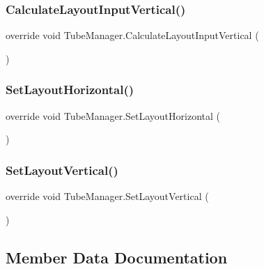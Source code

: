 \subsubsection{\texorpdfstring{Calculate\+Layout\+Input\+Vertical()}{CalculateLayoutInputVertical()}}
{\footnotesize\ttfamily override void Tube\+Manager.\+Calculate\+Layout\+Input\+Vertical (\begin{DoxyParamCaption}{ }\end{DoxyParamCaption})\hspace{0.3cm}{\ttfamily [inline]}}

\mbox{\label{class_tube_manager_a3a369e137062906ec47a4e1db6cad5e4}} 
\subsubsection{\texorpdfstring{Set\+Layout\+Horizontal()}{SetLayoutHorizontal()}}
{\footnotesize\ttfamily override void Tube\+Manager.\+Set\+Layout\+Horizontal (\begin{DoxyParamCaption}{ }\end{DoxyParamCaption})\hspace{0.3cm}{\ttfamily [inline]}}

\mbox{\label{class_tube_manager_afd4503acb46cbd0e5f717cb0cae13c01}} 
\subsubsection{\texorpdfstring{Set\+Layout\+Vertical()}{SetLayoutVertical()}}
{\footnotesize\ttfamily override void Tube\+Manager.\+Set\+Layout\+Vertical (\begin{DoxyParamCaption}{ }\end{DoxyParamCaption})\hspace{0.3cm}{\ttfamily [inline]}}



\subsection{Member Data Documentation}
\mbox{\label{class_tube_manager_a9a284a4efcadd631df2d3585bf8a6785}} 

